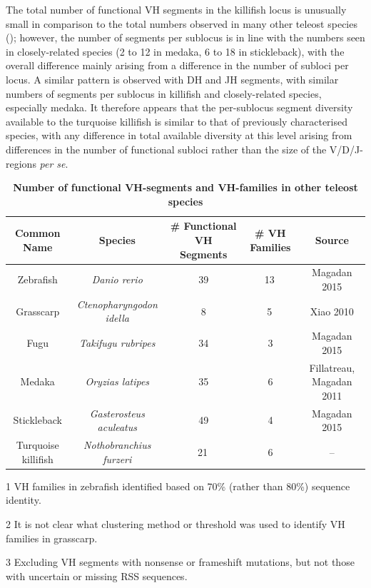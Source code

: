 	The total number of functional VH segments in the killifish locus is unusually small in comparison to the total numbers observed in many other teleost species (); however, the number of segments per sublocus is in line with the numbers seen in closely-related species (2 to 12 in medaka, 6 to 18 in stickleback), with the overall difference mainly arising from a difference in the number of subloci per locus. A similar pattern is observed with DH and JH segments, with similar numbers of segments per sublocus in killifish and closely-related species, especially medaka. It therefore appears that the per-sublocus segment diversity available to the turquoise killifish is similar to that of previously characterised species, with any difference in total available diversity at this level arising from differences in the number of functional subloci rather than the size of the V/D/J-regions \textit{per se}.
	
	\begin{table}
	\begin{threeparttable}
	\caption{\textbf{Number of functional VH-segments and VH-families in other teleost species}}
	\label{tab:teleost-vh-counts}
	\begin{tabular}{ccccc}\toprule
	\textbf{Common Name} & \textbf{Species} & \textbf{\# Functional VH Segments} & \textbf{\# VH Families} & \textbf{Source}\\\midrule
	Zebrafish & \textit{Danio rerio} & 39 & 13\,\tnote{1} & Magadan 2015 \\
	Grasscarp & \textit{Ctenopharyngodon idella} & 8 & 5\,\tnote{2} & Xiao 2010 \\
	Fugu & \textit{Takifugu rubripes} & 34 & 3 & Magadan 2015 \\
	Medaka & \textit{Oryzias latipes} & 35 & 6 & Fillatreau, Magadan 2011 \\
	Stickleback & \textit{Gasterosteus aculeatus} & 49 & 4 & Magadan 2015 \\
	Turquoise killifish & \textit{Nothobranchius furzeri} & 21\,\tnote{3} & 6 & -- \\
	\bottomrule\end{tabular}
	\begin{tablenotes}
	\item[1] VH families in zebrafish identified based on 70\% (rather than 80\%) sequence identity.
	\item[2] It is not clear what clustering method or threshold was used to identify VH families in grasscarp.
	\item[3] Excluding VH segments with nonsense or frameshift mutations, but not those with uncertain or missing RSS sequences.
	\end{tablenotes}
	\end{threeparttable}
	\end{table} %
	
